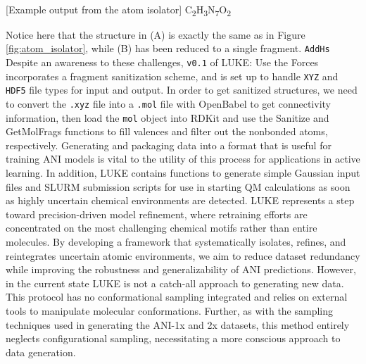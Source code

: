 \begin{flushleft}
\begin{multiFigure}
\begin{centering}
    \\
[Example output from the atom isolator]{
C\textsubscript{2}H\textsubscript{3}N\textsubscript{7}O\textsubscript{2} 
}
\label{fig:sanitization}
\end{centering}
\end{multiFigure}
\end{flushleft}

Notice here that the structure in (A) is exactly the same as in Figure \ref{fig:atom_isolator}, while (B) has been reduced to a single fragment.
 \verb|AddHs| 
Despite an awareness to these challenges, \verb|v0.1| of LUKE: Use the Forces incorporates a fragment sanitization scheme, and is set up to handle \verb|XYZ| and \verb|HDF5| file types for input and output. 
In order to get sanitized structures, we need to convert the \verb|.xyz| file into a \verb|.mol| file with OpenBabel \cite{babel} to get connectivity information, then load the \verb|mol| object into RDKit and use the Sanitize and GetMolFrags functions to fill valences and filter out the nonbonded atoms, respectively.
Generating and packaging data into a format that is useful for training ANI models is vital to the utility of this process for applications in active learning.
In addition, LUKE contains functions to generate simple Gaussian \cite{gaussian16} input files and SLURM \cite{slurm} submission scripts for use in starting QM calculations as soon as highly uncertain chemical environments are detected.
LUKE represents a step toward precision-driven model refinement, where retraining efforts are concentrated on the most challenging chemical motifs rather than entire molecules. 
By developing a framework that systematically isolates, refines, and reintegrates uncertain atomic environments, we aim to reduce dataset redundancy while improving the robustness and generalizability of ANI predictions.
However, in the current state LUKE is not a catch-all approach to generating new data.
This protocol has no conformational sampling integrated and relies on external tools to manipulate molecular conformations.
Further, as with the sampling techniques used in generating the ANI-1x \cite{1x_1ccx_datasets} and 2x \cite{2x_dataset} datasets, this method entirely neglects configurational sampling, necessitating a more conscious approach to data generation.


